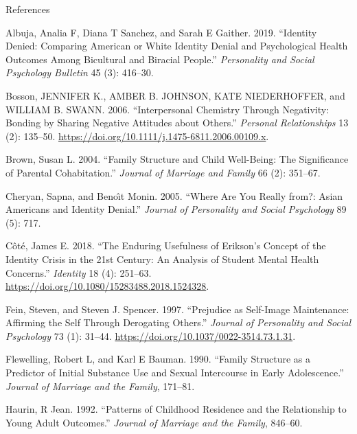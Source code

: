 \documentclass[
  ignorenonframetext,
  aspectratio=169,
]{beamer}
\newlength{\cslhangindent}
\newenvironment{CSLReferences}[2] %
 {\begin{list}{}{%
  \setlength{\itemindent}{0pt}
  \setlength{\leftmargin}{0pt}
  \setlength{\parsep}{0pt}
  \ifodd #1
   \setlength{\leftmargin}{\cslhangindent}
   \setlength{\itemindent}{-1\cslhangindent}
  \fi
  \setlength{\itemsep}{#2\baselineskip}}}
 {\end{list}}
\begin{document}
\begin{frame}{References}
\label{references}
\label{refs}
\begin{CSLReferences}{1}{0}
Albuja, Analia F, Diana T Sanchez, and Sarah E Gaither. 2019.
{``Identity Denied: Comparing American or White Identity Denial and
Psychological Health Outcomes Among Bicultural and Biracial People.''}
\emph{Personality and Social Psychology Bulletin} 45 (3): 416--30.

Bosson, JENNIFER K., AMBER B. JOHNSON, KATE NIEDERHOFFER, and WILLIAM B.
SWANN. 2006. {``Interpersonal Chemistry Through Negativity: Bonding by
Sharing Negative Attitudes about Others.''} \emph{Personal
Relationships} 13 (2): 135--50.
\url{https://doi.org/10.1111/j.1475-6811.2006.00109.x}.

Brown, Susan L. 2004. {``Family Structure and Child Well-Being: The
Significance of Parental Cohabitation.''} \emph{Journal of Marriage and
Family} 66 (2): 351--67.

Cheryan, Sapna, and Benoı̂t Monin. 2005. {``Where Are You Really from?:
Asian Americans and Identity Denial.''} \emph{Journal of Personality and
Social Psychology} 89 (5): 717.

Côté, James E. 2018. {``The Enduring Usefulness of Erikson{'}s Concept
of the Identity Crisis in the 21st Century: An Analysis of Student
Mental Health Concerns.''} \emph{Identity} 18 (4): 251--63.
\url{https://doi.org/10.1080/15283488.2018.1524328}.

Fein, Steven, and Steven J. Spencer. 1997. {``Prejudice as Self-Image
Maintenance: Affirming the Self Through Derogating Others.''}
\emph{Journal of Personality and Social Psychology} 73 (1): 31--44.
\url{https://doi.org/10.1037/0022-3514.73.1.31}.

Flewelling, Robert L, and Karl E Bauman. 1990. {``Family Structure as a
Predictor of Initial Substance Use and Sexual Intercourse in Early
Adolescence.''} \emph{Journal of Marriage and the Family}, 171--81.

Haurin, R Jean. 1992. {``Patterns of Childhood Residence and the
Relationship to Young Adult Outcomes.''} \emph{Journal of Marriage and
the Family}, 846--60.


\end{CSLReferences}
\end{frame}
\end{document}
